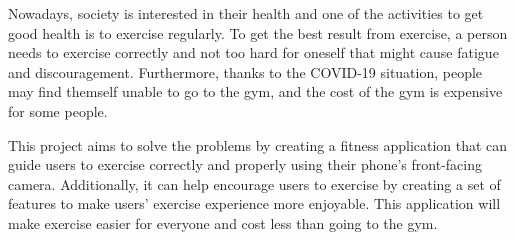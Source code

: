 Nowadays, society is interested in their health and one of the activities to get good health is to exercise regularly. To get the best result from exercise, a person needs to exercise correctly and not too hard for oneself that might cause fatigue and discouragement. Furthermore, thanks to the COVID-19 situation, people may find themself unable to go to the gym, and the cost of the gym is expensive for some people.

This project aims to solve the problems by creating a fitness application that can guide users to exercise correctly and properly using their phone's front-facing camera. Additionally, it can help encourage users to exercise by creating a set of features to make users' exercise experience more enjoyable. This application will make exercise easier for everyone and cost less than going to the gym.